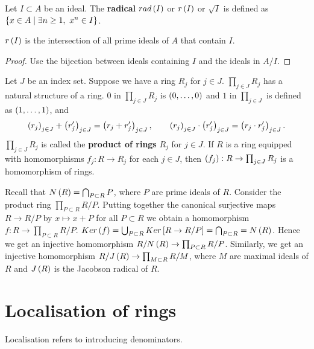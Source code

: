 Let $ I \subset A $ be an ideal. The \textbf{radical} $ rad\left( I \right) $ or $ r\left( I \right) $ or $ \sqrt{I} $ is defined as $ \left\{ x \in A \mid \exists n \ge 1, \ x^n \in I \right\} $.

\begin{proposition}
$ r\left( I \right) $ is the intersection of all prime ideals of $ A $ that contain $ I $.
\end{proposition}

\begin{proof}
Use the bijection between ideals containing $ I $ and the ideals in $ A / I $.
\end{proof}


\begin{definition}
Let $ J $ be an index set. Suppose we have a ring $ R_j $ for $ j \in J $. $ \prod_{j \in J} R_j $ has a natural structure of a ring. $ 0 $ in $ \prod_{j \in J} R_j $ is $ \left( 0, \dots, 0 \right) $ and $ 1 $ in $ \prod_{j \in J} $ is defined as $ \left( 1, \dots, 1 \right) $, and
$$ \left( r_j \right)_{j \in J} + \left( r'_j \right)_{j \in J} = \left( r_j + r'_j \right)_{j \in J}, \qquad \left( r_j \right)_{j \in J} \cdot \left( r'_j \right)_{j \in J} = \left( r_j \cdot r'_j \right)_{j \in J}. $$
$ \prod_{j \in J} R_j $ is called the \textbf{product of rings} $ R_j $ for $ j \in J $. If $ R $ is a ring equipped with homomorphisms $ f_j : R \to R_j $ for each $ j \in J $, then $ \left( f_j \right) : R \to \prod_{j \in J} R_j $ is a homomorphism of rings.
\end{definition}

Recall that $ N\left( R \right) = \bigcap_{P \subset R} P $, where $ P $ are prime ideals of $ R $. Consider the product ring $ \prod_{P \subset R} R / P $. Putting together the canonical surjective maps $ R \to R / P $ by $ x \mapsto x + P $ for all $ P \subset R $ we obtain a homomorphism $ f : R \to \prod_{P \subset R} R / P $. $ Ker\left( f \right) = \bigcup_{P \subset R} Ker\left[ R \to R / P \right] = \bigcap_{P \subset R} = N\left( R \right) $. Hence we get an injective homomorphism $ R / N\left( R \right) \to \prod_{P \subset R} R / P $. Similarly, we get an injective homomorphism $ R / J\left( R \right) \to \prod_{M \subset R} R / M $, where $ M $ are maximal ideals of $ R $ and $ J\left( R \right) $ is the Jacobson radical of $ R $.

\pagebreak

\section{Localisation of rings}

Localisation refers to introducing denominators.

